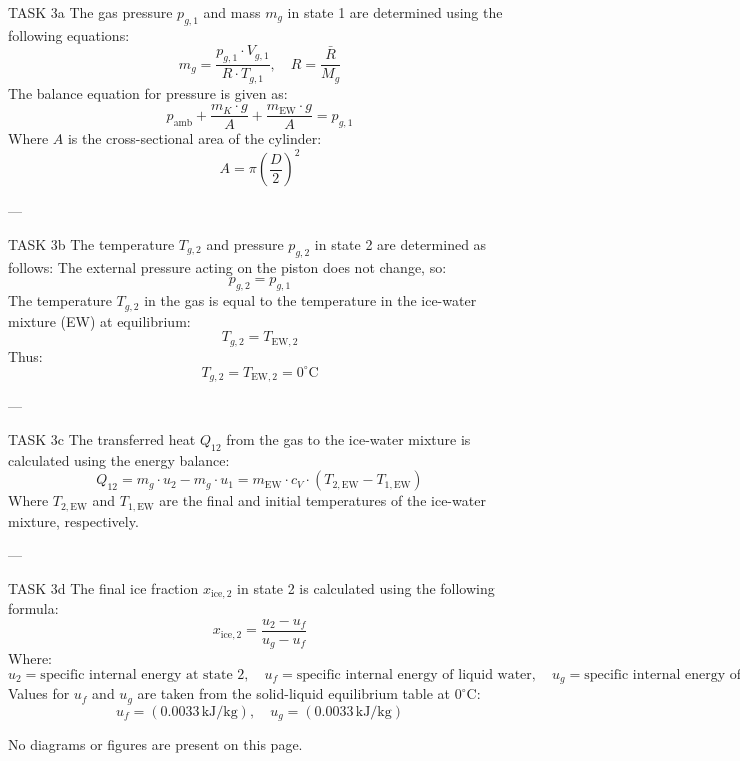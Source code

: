 TASK 3a  
The gas pressure \( p_{g,1} \) and mass \( m_g \) in state 1 are determined using the following equations:  
\[
m_g = \frac{p_{g,1} \cdot V_{g,1}}{R \cdot T_{g,1}}, \quad R = \frac{\bar{R}}{M_g}
\]  
The balance equation for pressure is given as:  
\[
p_{\text{amb}} + \frac{m_K \cdot g}{A} + \frac{m_{\text{EW}} \cdot g}{A} = p_{g,1}
\]  
Where \( A \) is the cross-sectional area of the cylinder:  
\[
A = \pi \left(\frac{D}{2}\right)^2
\]  

---

TASK 3b  
The temperature \( T_{g,2} \) and pressure \( p_{g,2} \) in state 2 are determined as follows:  
The external pressure acting on the piston does not change, so:  
\[
p_{g,2} = p_{g,1}
\]  
The temperature \( T_{g,2} \) in the gas is equal to the temperature in the ice-water mixture (EW) at equilibrium:  
\[
T_{g,2} = T_{\text{EW},2}
\]  
Thus:  
\[
T_{g,2} = T_{\text{EW},2} = 0^\circ\text{C}
\]  

---

TASK 3c  
The transferred heat \( Q_{12} \) from the gas to the ice-water mixture is calculated using the energy balance:  
\[
Q_{12} = m_g \cdot u_2 - m_g \cdot u_1 = m_{\text{EW}} \cdot c_V \cdot (T_{2,\text{EW}} - T_{1,\text{EW}})
\]  
Where \( T_{2,\text{EW}} \) and \( T_{1,\text{EW}} \) are the final and initial temperatures of the ice-water mixture, respectively.  

---

TASK 3d  
The final ice fraction \( x_{\text{ice},2} \) in state 2 is calculated using the following formula:  
\[
x_{\text{ice},2} = \frac{u_2 - u_f}{u_g - u_f}
\]  
Where:  
\[
u_2 = \text{specific internal energy at state 2}, \quad u_f = \text{specific internal energy of liquid water}, \quad u_g = \text{specific internal energy of ice}
\]  
Values for \( u_f \) and \( u_g \) are taken from the solid-liquid equilibrium table at \( 0^\circ\text{C} \):  
\[
u_f = (0.0033 \, \text{kJ/kg}), \quad u_g = (0.0033 \, \text{kJ/kg})
\]  

No diagrams or figures are present on this page.